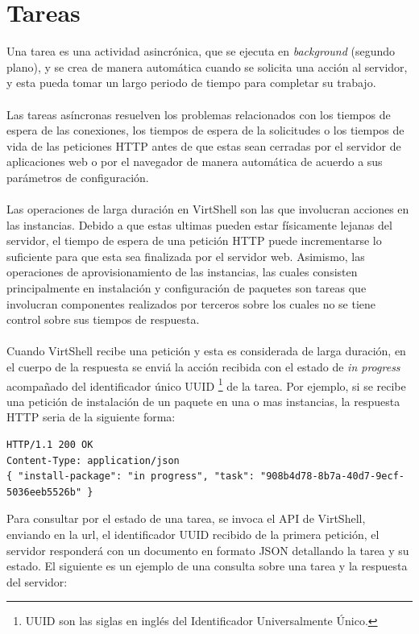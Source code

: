 \section{Tareas}
Una tarea es una actividad asincrónica, que se ejecuta en \emph{background} (segundo plano), y se crea de manera automática cuando se solicita una acción al servidor, y esta pueda tomar un largo periodo de tiempo para completar su trabajo.\\
\\
Las tareas asíncronas resuelven los problemas relacionados con los tiempos de espera de las conexiones, los tiempos de espera de la solicitudes o los tiempos de vida de las peticiones HTTP antes de que estas sean cerradas por el servidor de aplicaciones web o por el navegador de manera automática de acuerdo a sus parámetros de configuración.\\
\\
Las operaciones de larga duración en VirtShell son las que involucran acciones en las instancias. Debido a que estas ultimas pueden estar físicamente lejanas del servidor, el tiempo de espera de una petición HTTP puede incrementarse lo suficiente para que esta sea finalizada por el servidor web. Asimismo, las operaciones de aprovisionamiento de las instancias, las cuales consisten principalmente en instalación y configuración de paquetes son tareas que involucran componentes realizados por terceros sobre los cuales no se tiene control sobre sus tiempos de respuesta.\\
\\
Cuando VirtShell recibe una petición y esta es considerada de larga duración, en el cuerpo de la respuesta se enviá la acción recibida con el estado de \emph{in progress} acompañado del identificador único UUID \footnote{UUID son las siglas en inglés del Identificador Universalmente Único.} de la tarea. Por ejemplo, si se recibe una petición de instalación de un paquete en una o mas instancias, la respuesta HTTP seria de la siguiente forma:

\begin{lstlisting}[style=json, caption=Ejemplo de respuesta HTTP referenciando a una tarea]
HTTP/1.1 200 OK
Content-Type: application/json
{ "install-package": "in progress", "task": "908b4d78-8b7a-40d7-9ecf-5036eeb5526b" }
\end{lstlisting}

\vspace{5mm}

Para consultar por el estado de una tarea, se invoca el API de VirtShell, enviando en la url, el identificador UUID recibido de la primera petición, el servidor responderá con un documento en formato JSON detallando la tarea y su estado. El siguiente es un ejemplo de una consulta sobre una tarea y la respuesta del servidor:

